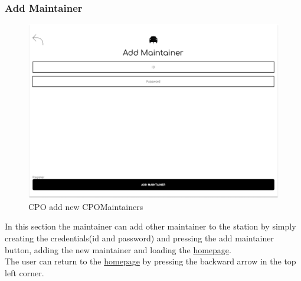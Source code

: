 \subsubsection{Add Maintainer}
\begin{figure}[H]
    \centering
    \includegraphics[keepaspectratio, width=15cm]{Mockup/CPMSSiteInterface/Add Maintainer.png}
    \caption{\ac{CPO} add new \ac{CPO}Maintainers}
    \label{cpo:Maintainer}
\end{figure}
In this section the maintainer can add other maintainer to the station by simply creating the credentials(id and password) and pressing the add maintainer button, adding the new maintainer and loading the \hyperref[cpo:Homepage]{homepage}.\\
The user can return to the \hyperref[cpo:Homepage]{homepage} by pressing the backward arrow in the top left corner.

\clearpage